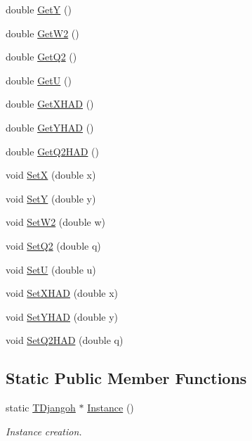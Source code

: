 \begin{DoxyCompactItemize}
\item 
double \hyperlink{class_t_djangoh_aee089d5536e8acb68236f9546e4f06e2}{GetY} ()
\item 
double \hyperlink{class_t_djangoh_a94c252e7c5375e9641ad5ea048098c06}{Get\+W2} ()
\item 
double \hyperlink{class_t_djangoh_afce6f0bfed90b20eb0f9310ae107291d}{Get\+Q2} ()
\item 
double \hyperlink{class_t_djangoh_a6e69090ac8581a1be96cac889cf5292b}{GetU} ()
\item 
double \hyperlink{class_t_djangoh_a64b580157191cf32f0b3ba4047b69bdf}{Get\+X\+H\+AD} ()
\item 
double \hyperlink{class_t_djangoh_a4cfb37ad76ec038f6e05b90341befb7f}{Get\+Y\+H\+AD} ()
\item 
double \hyperlink{class_t_djangoh_a969e748da53637a3732a27cfe23a34d2}{Get\+Q2\+H\+AD} ()
\item 
void \hyperlink{class_t_djangoh_a1ef3828a15dfd67a5e5c902bd584fd8b}{SetX} (double x)
\item 
void \hyperlink{class_t_djangoh_a91061fe2a386a9ddb7c7398c9443fa74}{SetY} (double y)
\item 
void \hyperlink{class_t_djangoh_aea9a499dfc8cbca480f228b79a05d99a}{Set\+W2} (double w)
\item 
void \hyperlink{class_t_djangoh_abecf2835ceecd72f0847544b72fd837e}{Set\+Q2} (double q)
\item 
void \hyperlink{class_t_djangoh_a69cebdc5dc26bfd0def872a996da0650}{SetU} (double u)
\item 
void \hyperlink{class_t_djangoh_a13173ef3490a98d8488ce7421905284c}{Set\+X\+H\+AD} (double x)
\item 
void \hyperlink{class_t_djangoh_a2dc4b62cd66dd41e8ae3d62965e36617}{Set\+Y\+H\+AD} (double y)
\item 
void \hyperlink{class_t_djangoh_a0066b103b2f779d8ed302fd77f42ee5e}{Set\+Q2\+H\+AD} (double q)
\end{DoxyCompactItemize}
\subsection*{Static Public Member Functions}
\begin{DoxyCompactItemize}
\item 
static \hyperlink{class_t_djangoh}{T\+Djangoh} $\ast$ \hyperlink{class_t_djangoh_a2e9871b8bec6326bb518f218dc87402c}{Instance} ()
\begin{DoxyCompactList}\small\item\em Instance creation. \end{DoxyCompactList}\end{DoxyCompactItemize}
